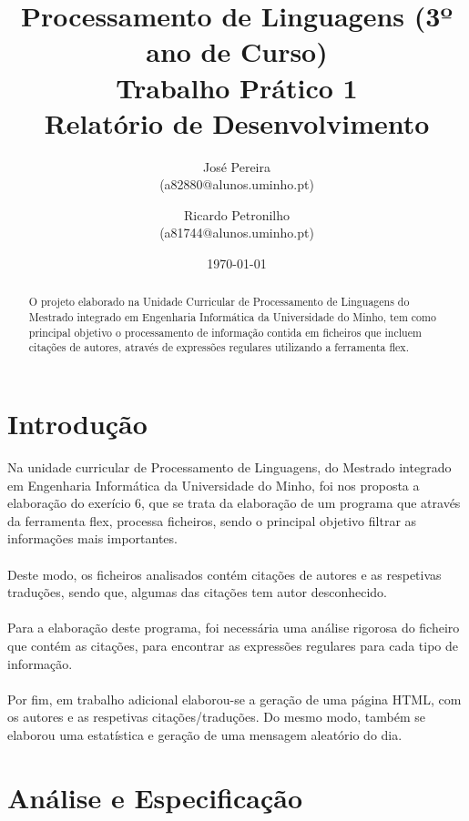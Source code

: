 \documentclass[11pt,a4paper]{report}%
\title{Processamento de Linguagens (3º ano de Curso)\\
       \textbf{Trabalho Prático 1}\\ Relatório de Desenvolvimento
       } %
\author{José Pereira\\ (a82880@alunos.uminho.pt) \and Ricardo Petronilho\\ (a81744@alunos.uminho.pt)
       } %
\date{\today} %
\begin{document}
\maketitle %

\begin{abstract}  %
O projeto elaborado na Unidade Curricular de Processamento de Linguagens do Mestrado integrado em Engenharia Informática da Universidade do Minho, tem como principal objetivo o processamento de informação contida em ficheiros que incluem citações de autores, através de expressões regulares utilizando a ferramenta flex.
\end{abstract}

\tableofcontents %

\chapter{Introdução} \label{chap:intro} %

Na unidade curricular de Processamento de Linguagens, do Mestrado integrado em Engenharia Informática da Universidade do Minho, foi nos proposta a elaboração do exerício 6, que se trata da elaboração de um programa que através da ferramenta flex, processa ficheiros, sendo o principal objetivo filtrar as informações mais importantes.\\\\
Deste modo, os ficheiros analisados contém citações de autores e as respetivas traduções, sendo que, algumas das citações tem autor desconhecido.\\\\Para a elaboração deste programa, foi necessária uma análise rigorosa do ficheiro que contém as citações, para encontrar as expressões regulares para cada tipo de informação. \\\\Por fim, em trabalho adicional elaborou-se a geração de uma página HTML, com os autores e as respetivas citações/traduções. Do mesmo modo, também se elaborou uma estatística e geração de uma mensagem aleatório do dia.


\chapter{Análise e Especificação} \label{chap:analiseEspecificacao} %
\end{document}
